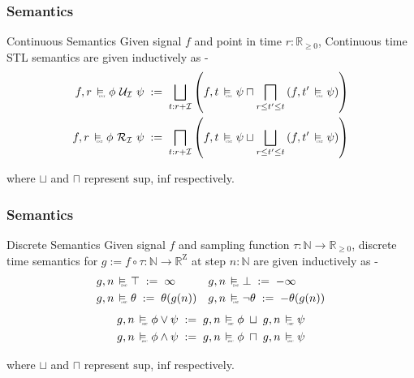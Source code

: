 \documentclass{beamer}
\newcommand{\typeTime}{\mathbb{R}_{\geq 0}}
\newcommand{\typeReal}{\mathbb{R}}
\newcommand{\typeNat}{\mathbb{N}}
\newcommand{\until}{\mathcal{U}}
\newcommand{\release}{\mathcal{R}}
\newcommand{\interval}{\mathcal{I}}
\newcommand{\Z}{\text{Z}}
\newcommand{\discrete}{\raisebox{-0.1ex}{\scalebox{0.25}{\textrm{DSC}}}}
\newcommand{\cont}{\raisebox{-0.1ex}{\scalebox{0.25}{\textrm{CNT}}}}
\newcommand{\discreteSatisfy}{\ \stackMath\stackunder[0pt]{\vDash}{\hspace*{0.3em}\discrete}\ }
\newcommand{\contSatisfy}{\ \stackMath\stackunder[0pt]{\vDash}{\hspace*{0.3em}\cont}\ }
\newcommand{\robustAssign}{\; := \;}
\begin{document}
\begin{frame}
    \frametitle{Semantics}
    \begin{block}{Continuous Semantics}
        Given signal $f$ and point in time $r : \typeTime$,
        Continuous time STL semantics are given inductively as -
        \begin{align*}
            f, r \contSatisfy \phi\ \until_{\interval}\ \psi
           \robustAssign \bigsqcup_{t: r+\interval}\left( f, t \contSatisfy \psi
           \sqcap \bigsqcap_{r \leq t' \leq t} \left( f, t' \contSatisfy \psi
            \right ) \right) \\
            f, r \contSatisfy \phi\ \release_{\interval}\ \psi
           \robustAssign \bigsqcap_{t: r+\interval}\left( f, t \contSatisfy \psi
           \sqcup \bigsqcup_{r \leq t' \leq t} \left( f, t' \contSatisfy \psi
            \right ) \right)
        \end{align*}
    \end{block}
    where $\sqcup$ and $\sqcap$ represent $\text{sup}$, $\text{inf}$ respectively.
\end{frame}

\begin{frame}
    \frametitle{Semantics}
    \begin{block}{Discrete Semantics}
        Given signal $f$ and sampling function $\tau : \typeNat
        \to \typeTime$, discrete time semantics for $g := f \circ \tau : \typeNat
        \to  \typeReal^{\Z}$ at step $n:\typeNat$ are given inductively as -
        \begin{align*}
              g, n &\discreteSatisfy \top       \robustAssign \infty &
              g, n &\discreteSatisfy \bot       \robustAssign -\infty \\
              g, n &\discreteSatisfy \theta     \robustAssign \theta(g(n)) &
              g, n &\discreteSatisfy \neg\theta \robustAssign -\theta(g(n)) \\
        \end{align*}
        \vspace{-1.6cm}
        \begin{align*}
            g, n \discreteSatisfy \phi \vee \psi  \robustAssign  g, n \discreteSatisfy \phi \; \sqcup \; g, n\discreteSatisfy \psi \\
            g, n \discreteSatisfy \phi \wedge \psi  \robustAssign  g, n \discreteSatisfy \phi \; \sqcap \; g, n \discreteSatisfy \psi \\
        \end{align*}
    \end{block}
    where $\sqcup$ and $\sqcap$ represent $\text{sup}$, $\text{inf}$ respectively.
\end{frame}
\end{document}
